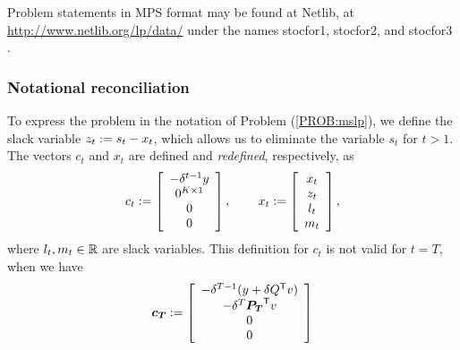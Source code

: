 Problem statements in MPS format may be found at Netlib, at \url{http://www.netlib.org/lp/data/} under the names stocfor1, stocfor2, and stocfor3  \cite{gassmannwww}.



\subsubsection{Notational reconciliation}
To express the problem in the notation of Problem (\ref{PROB:mslp}), we define the slack variable $z_t := s_t - x_t$, which allows us to eliminate the variable $s_t$ for $t>1$.  The vectors $c_t$ and $x_t$ are defined and \emph{redefined}, respectively, as
\begin{equation*}
c_t := \left[
	\begin{array}{c}
		-\delta^{t-1} y\\
		0^{K \times 1}\\
		0\\
		0
	\end{array}
	\right], \hspace{0.3in}
x_t := \left[
	\begin{array}{c}
		x_t\\
		z_t\\
		l_t\\
		m_t
	\end{array}
	\right],
\end{equation*}
where $l_t, m_t \in {\mathbb R}$ are slack variables.  This definition for $c_t$ is not valid for $t=T$, when we have
\begin{equation*}
\mathbf{\boldsymbol{c_T}} := \left[
	\begin{array}{c}
		-\delta^{T-1} (y + \delta Q^{\mbox{\scriptsize\sf T}} v)\\
		-\delta^T \mathbf{\boldsymbol{P_T}}^{\mbox{\scriptsize\sf T}} v\\
		0\\
		0
	\end{array}
		\right]
\end{equation*}

